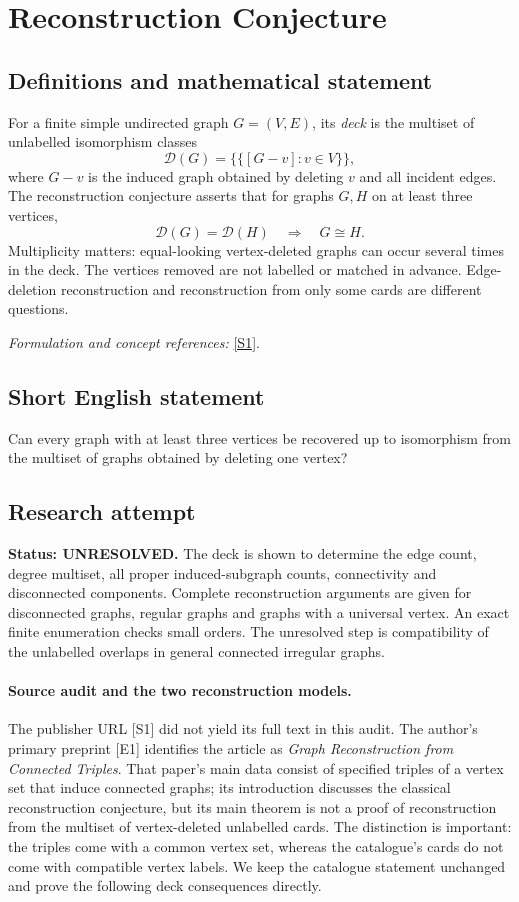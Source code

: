 \documentclass[11pt]{article}
\begin{document}
\section*{\texorpdfstring{Reconstruction Conjecture}{Reconstruction Conjecture}}\label{15}
\subsection{Definitions and mathematical statement}
For a finite simple undirected graph $G=(V,E)$, its \emph{deck} is the multiset of unlabelled isomorphism classes
\[
 \mathcal D(G)=\bigl\{\!\bigl\{[G-v]:v\in V\bigr\}\!\bigr\},
\]
where $G-v$ is the induced graph obtained by deleting $v$ and all incident edges. The reconstruction conjecture asserts that for graphs $G,H$ on at least three vertices,
\[
 \mathcal D(G)=\mathcal D(H)\quad\Longrightarrow\quad G\cong H.
\]
Multiplicity matters: equal-looking vertex-deleted graphs can occur several times in the deck. The vertices removed are not labelled or matched in advance. Edge-deletion reconstruction and reconstruction from only some cards are different questions.
\par\smallskip\textit{Formulation and concept references:} \href{https://www.sciencedirect.com/science/article/abs/pii/S0012365X26000828}{[S1]}.

\subsection{Short English statement}
Can every graph with at least three vertices be recovered up to isomorphism from the multiset of graphs obtained by deleting one vertex?
\subsection{Research attempt}
\textbf{Status: UNRESOLVED.} The deck is shown to determine the edge count, degree multiset, all proper induced-subgraph counts, connectivity and disconnected components. Complete reconstruction arguments are given for disconnected graphs, regular graphs and graphs with a universal vertex. An exact finite enumeration checks small orders. The unresolved step is compatibility of the unlabelled overlaps in general connected irregular graphs.

\paragraph{Source audit and the two reconstruction models.}
The publisher URL [S1] did not yield its full text in this audit. The author's primary preprint [E1] identifies the article as \emph{Graph Reconstruction from Connected Triples}. That paper's main data consist of specified triples of a vertex set that induce connected graphs; its introduction discusses the classical reconstruction conjecture, but its main theorem is not a proof of reconstruction from the multiset of vertex-deleted unlabelled cards. The distinction is important: the triples come with a common vertex set, whereas the catalogue's cards do not come with compatible vertex labels. We keep the catalogue statement unchanged and prove the following deck consequences directly.
\end{document}
